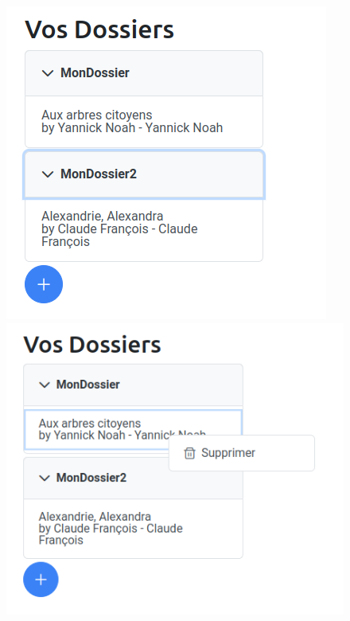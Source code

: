 \documentclass[12pt,french]{article}
\begin{document}
\begin{figure}[H]
	\centering
	\begin{minipage}{.3\textwidth}
		\centering
		\includegraphics[scale=0.4]{dossier3.png}
	\end{minipage}%
	\begin{minipage}{.3\textwidth}
		\centering
		\includegraphics[scale=0.4]{dossier4.png}
	\end{minipage}
\begin{minipage}{.3\textwidth}
	\centering

\end{minipage}
\end{figure}
\end{document}
